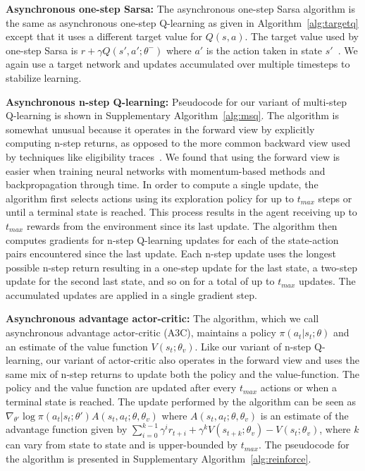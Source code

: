 %
%
%
%

%

\textbf{Asynchronous one-step Sarsa:}
The asynchronous one-step Sarsa algorithm is the same as asynchronous one-step Q-learning as given in Algorithm~\ref{alg:targetq} except that it uses a different target value for $Q(s,a)$.
The target value used by one-step Sarsa is $r + \gamma Q(s', a'; \theta^-)$ where $a'$ is the action taken in state $s'$~\citep{rummery1994sarsa,sutton:book}.
%
%
%
%
%
%
%
%
%
We again use a target network and updates accumulated over multiple timesteps to stabilize learning.

%

%
%
%
%
%
%
%
%
%
%
%
%
%
%
%
%
%
%
%
%
%
%
%
%
%
%
%
%
%
%
%
%
%
%
%
%
%
%
%
%
%

\textbf{Asynchronous n-step Q-learning:}
Pseudocode for our variant of multi-step Q-learning is shown in Supplementary Algorithm~\ref{alg:msq}.
The algorithm is somewhat unusual because it operates in the forward view by explicitly computing n-step returns, as opposed to the more common backward view used by techniques like eligibility traces~\citep{sutton:book}.
We found that using the forward view is easier when training neural networks with momentum-based methods and backpropagation through time.
In order to compute a single update, the algorithm first selects actions using its exploration policy for up to $t_{max}$ steps or until a terminal state is reached.
This process results in the agent receiving up to $t_{max}$ rewards from the environment since its last update.
The algorithm then computes gradients for n-step Q-learning updates for each of the state-action pairs encountered since the last update.
Each n-step update uses the longest possible n-step return resulting in a one-step update for the last state, a two-step update for the second last state, and so on for a total of up to $t_{max}$ updates.
The accumulated updates are applied in a single gradient step.

%

%
%
%
%
%
%
%
%
%
%
%
%
%
%
%
%
%
%
%
%
%
%
%
%
%
%
%
%
%
%
%
%
%
%
%
%
%

\textbf{Asynchronous advantage actor-critic:}
The algorithm, which we call asynchronous advantage actor-critic (A3C), maintains a policy $\pi(a_t|s_t;\theta)$ and an estimate of the value function $V(s_t;\theta_v)$.
Like our variant of n-step Q-learning, our variant of actor-critic also operates in the forward view and uses the same mix of n-step returns to update both the policy and the value-function.
The policy and the value function are updated after every $t_{max}$ actions or when a terminal state is reached.
The update performed by the algorithm can be seen as $\nabla_{\theta'} \log\pi(a_t|s_t;\theta') A(s_t,a_t;\theta,\theta_v)$ where $A(s_t,a_t;\theta,\theta_v)$ is an estimate of the advantage function given by $\sum_{i=0}^{k-1}\gamma^i r_{t+i} + \gamma^k V(s_{t+k};\theta_v)-V(s_t;\theta_v)$, where $k$ can vary from state to state and is upper-bounded by $t_{max}$.
The pseudocode for the algorithm is presented in Supplementary Algorithm~\ref{alg:reinforce}.



